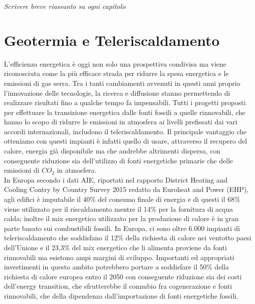 \documentclass[laurea,oneside,11pt]{USiena_tesiLM}
\begin{document}
\textit{Scrivere breve riassunto su ogni capitolo}

\chapter{Geotermia e Teleriscaldamento}
L'efficienza energetica è oggi non solo una prospettiva condivisa ma viene riconosciuta come la più efficace strada per ridurre la spesa energetica e le emissioni di gas serra. Tra i tanti cambiamenti avvenuti in questi anni proprio l'innovazione delle tecnologie, la ricerca e diffusione stanno permettendo di realizzare risultati fino a qualche tempo fa impensabili. Tutti i progetti proposti per effettuare la transizione energetica dalle fonti fossili a quelle rinnovabili, che hanno lo scopo di ridurre le emissioni in atmosfera ai livelli prefissati dai vari accordi internazionali, includono il teleriscaldamento.
Il principale vantaggio che otteniamo con questi impianti è infatti quello di usare, attraverso il recupero del calore, energia già disponibile ma che andrebbe altrimenti dispersa, con conseguente riduzione sia dell'utilizzo di fonti energetiche primarie che delle emissioni di $CO_2$ in atmosfera.\\

In Europa secondo i dati AIE, riportati nel rapporto District Heating and Cooling Contry by Country Survey 2015 redatto da Euroheat and Power (EHP), agli edifici è imputabile il 40\% del consumo finale di energia e di questi il 68\% viene utilizzato per il riscaldamento mentre il 14\% per la fornitura di acqua calda; inoltre il mix energetico utilizzato per la produzione di calore è in gran parte basato sui combustibili fossili. In Europa, ci sono oltre 6.000 impianti di teleriscaldamento che soddisfano il 12\% della richiesta di calore nei ventotto paesi dell'Unione e il 23,3\% del mix energetico che li alimenta proviene da fonti rinnovabili ma esistono ampi margini di sviluppo. Importanti ed appropriati investimenti in questo ambito potrebbero portare a soddisfare il 50\% della richiesta di calore europea entro il 2050 con conseguente riduzione sia dei costi dell'energy transition, che sfrutterebbe il connubio fra cogenerazione e fonti rinnovabili, che della dipendenza dall'importazione di fonti energetiche fossili.\\
\end{document}
